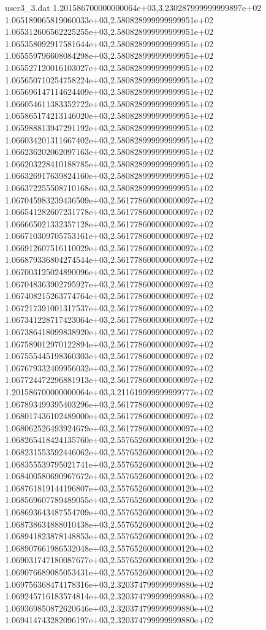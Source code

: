 \begin{filecontents}{user3_3.dat}
1.201586700000000064e+03,3.230287999999999897e+02
1.065189065819060033e+03,2.580828999999999951e+02
1.065312606562225255e+03,2.580828999999999951e+02
1.065358092917581644e+03,2.580828999999999951e+02
1.065559796608084298e+03,2.580828999999999951e+02
1.065527120016103027e+03,2.580828999999999951e+02
1.065650710254758224e+03,2.580828999999999951e+02
1.065696147114624409e+03,2.580828999999999951e+02
1.066054611383352722e+03,2.580828999999999951e+02
1.065865174213146020e+03,2.580828999999999951e+02
1.065988813947291192e+03,2.580828999999999951e+02
1.066034201311667402e+03,2.580828999999999951e+02
1.066236202062097163e+03,2.580828999999999951e+02
1.066203228410188785e+03,2.580828999999999951e+02
1.066326917639824160e+03,2.580828999999999951e+02
1.066372255508710168e+03,2.580828999999999951e+02
1.067045983239436509e+03,2.561778600000000097e+02
1.066541282607231778e+03,2.561778600000000097e+02
1.066665021332357128e+03,2.561778600000000097e+02
1.066710309705753161e+03,2.561778600000000097e+02
1.066912607516110029e+03,2.561778600000000097e+02
1.066879336804274544e+03,2.561778600000000097e+02
1.067003125024890096e+03,2.561778600000000097e+02
1.067048363902795927e+03,2.561778600000000097e+02
1.067408215263774764e+03,2.561778600000000097e+02
1.067217391001317537e+03,2.561778600000000097e+02
1.067341228717423064e+03,2.561778600000000097e+02
1.067386418099838920e+03,2.561778600000000097e+02
1.067589012970122894e+03,2.561778600000000097e+02
1.067555445198360303e+03,2.561778600000000097e+02
1.067679332409956032e+03,2.561778600000000097e+02
1.067724472296881913e+03,2.561778600000000097e+02
1.201586700000000064e+03,3.211619999999999777e+02
1.067893499395403296e+03,2.561778600000000097e+02
1.068017436102489000e+03,2.561778600000000097e+02
1.068062526493924679e+03,2.561778600000000097e+02
1.068265418424135760e+03,2.557652600000000120e+02
1.068231553592446062e+03,2.557652600000000120e+02
1.068355539795021741e+03,2.557652600000000120e+02
1.068400580690967672e+03,2.557652600000000120e+02
1.068761819144196807e+03,2.557652600000000120e+02
1.068569607789489055e+03,2.557652600000000120e+02
1.068693643487554709e+03,2.557652600000000120e+02
1.068738634888010438e+03,2.557652600000000120e+02
1.068941823878148853e+03,2.557652600000000120e+02
1.068907661986532048e+03,2.557652600000000120e+02
1.069031747180087677e+03,2.557652600000000120e+02
1.069076689085053431e+03,2.557652600000000120e+02
1.069756368474178316e+03,2.320374799999999880e+02
1.069245716183574814e+03,2.320374799999999880e+02
1.069369850872620646e+03,2.320374799999999880e+02
1.069414743282096197e+03,2.320374799999999880e+02

\end{filecontents}
